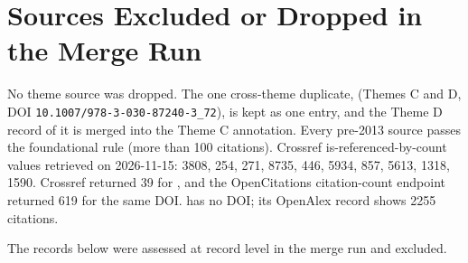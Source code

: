 \documentclass[journal,onecolumn]{IEEEtran}
\begin{document}
\section{Sources Excluded or Dropped in the Merge Run}

No theme source was dropped. The one cross-theme duplicate, \cite{Chen2021AMINN} (Themes C and D, DOI \nolinkurl{10.1007/978-3-030-87240-3_72}), is kept as one entry, and the Theme D record of it is merged into the Theme C annotation. Every pre-2013 source passes the foundational rule (more than 100 citations). Crossref is-referenced-by-count values retrieved on 2026-11-15: \cite{Carroll1970Individual} 3808, \cite{Kiers1999PARAFAC2} 254, \cite{MartinezMontes2004Concurrent} 271, \cite{Kolda2009Tensor} 8735, \cite{Memoli2011GromovWasserstein} 446, \cite{Avants2008Symmetric} 5934, \cite{Brett2001Spatial} 857, \cite{Lambin2012Radiomics} 5613, \cite{Bates2003Voxel} 1318, \cite{Beg2005Computing} 1590. Crossref returned 39 for \cite{Bro1996Multiway}, and the OpenCitations citation-count endpoint returned 619 for the same DOI. \cite{Harshman1970Foundations} has no DOI; its OpenAlex record shows 2255 citations.

The records below were assessed at record level in the merge run and excluded.
\end{document}
